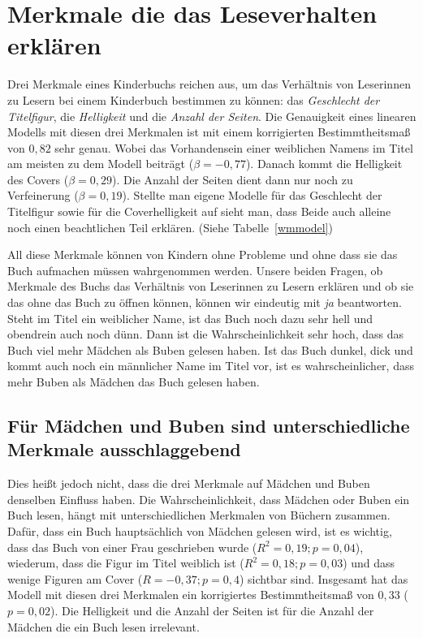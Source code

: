 \chapter{Merkmale die das Leseverhalten erklären}

Drei Merkmale eines Kinderbuchs reichen aus, um das Verhältnis von
Leserinnen zu Lesern bei einem Kinderbuch bestimmen zu können: das
\emph{Geschlecht der Titelfigur}, die \emph{Helligkeit} und die
\emph{Anzahl der Seiten}. Die Genauigkeit eines linearen Modells mit
diesen drei Merkmalen ist mit einem korrigierten Bestimmtheitsmaß von
$0{,}82$ sehr genau. Wobei das Vorhandensein einer weiblichen Namens im
Titel am meisten zu dem Modell beiträgt ($\beta=-0{,}77$). Danach kommt
die Helligkeit des Covers ($\beta=0{,}29$). Die Anzahl der Seiten dient
dann nur noch zu Verfeinerung ($\beta=0{,}19$). Stellte man eigene
Modelle für das Geschlecht der Titelfigur sowie für die Coverhelligkeit
auf sieht man, dass Beide auch alleine noch einen beachtlichen Teil
erklären. (Siehe Tabelle~\ref{wmmodel})

All diese Merkmale können von Kindern ohne Probleme und ohne dass sie
das Buch aufmachen müssen wahrgenommen werden. Unsere beiden Fragen, ob
Merkmale des Buchs das Verhältnis von Leserinnen zu Lesern erklären und
ob sie das ohne das Buch zu öffnen können, können wir eindeutig mit
\emph{ja} beantworten. Steht im Titel ein weiblicher Name, ist das Buch
noch dazu sehr hell und obendrein auch noch dünn. Dann ist die
Wahrscheinlichkeit sehr hoch, dass das Buch viel mehr Mädchen als Buben
gelesen haben. Ist das Buch dunkel, dick und kommt auch noch ein
männlicher Name im Titel vor, ist es wahrscheinlicher, dass mehr Buben
als Mädchen das Buch gelesen haben.



\section{Für Mädchen und Buben sind unterschiedliche Merkmale
ausschlaggebend}

Dies heißt jedoch nicht, dass die drei Merkmale auf Mädchen und Buben
denselben Einfluss haben. Die Wahrscheinlichkeit, dass Mädchen oder
Buben ein Buch lesen, hängt mit unterschiedlichen Merkmalen von Büchern
zusammen. Dafür, dass ein Buch hauptsächlich von Mädchen gelesen wird,
ist es wichtig, dass das Buch von einer Frau geschrieben wurde
($R^2=0{,}19; p=0{,}04$), wiederum, dass die Figur im Titel weiblich ist
($R^2=0{,}18; p=0{,}03$) und dass wenige Figuren am Cover
($R=-0{,}37; p=0{,}4$) sichtbar sind. Insgesamt hat das Modell mit
diesen drei Merkmalen ein korrigiertes Bestimmtheitsmaß von $0{,}33$
($p=0{,}02$). Die Helligkeit und die Anzahl der Seiten ist für die
Anzahl der Mädchen die ein Buch lesen irrelevant.

